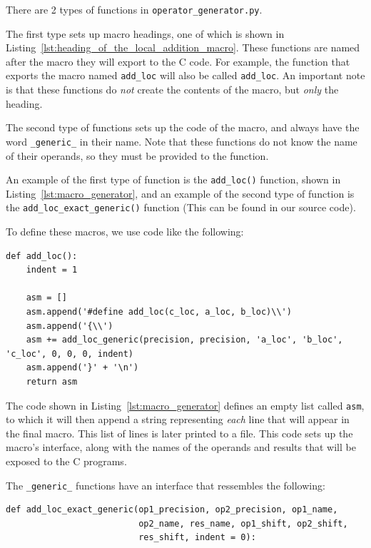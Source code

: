 \documentclass[12pt, a4paper]{report}
\begin{document}
There are 2 types of functions in \verb+operator_generator.py+.

The first type sets up macro headings, one of which is shown in
Listing~\ref{lst:heading_of_the_local_addition_macro}.
These functions are named after the macro they will export to the C code.
For example, the function that exports the macro named \verb+add_loc+ will also
be called \verb+add_loc+.
An important note is that these functions do \emph{not} create the contents of
the macro, but \emph{only} the heading.

The second type of functions sets up the code of the macro, and always have the
word \verb+_generic_+ in their name.
Note that these functions do not know the name of their operands, so they must
be provided to the function.

An example of the first type of function is the \verb+add_loc()+ function, shown
in Listing~\ref{lst:macro_generator}, and an example of the second type of
function is the \verb+add_loc_exact_generic()+ function (This can be found in
our source code).

To define these macros, we use code like the following:
\begin{lstlisting}
def add_loc():
    indent = 1

    asm = []
    asm.append('#define add_loc(c_loc, a_loc, b_loc)\\')
    asm.append('{\\')
    asm += add_loc_generic(precision, precision, 'a_loc', 'b_loc', 'c_loc', 0, 0, 0, indent)
    asm.append('}' + '\n')
    return asm
\end{lstlisting}

The code shown in Listing~\ref{lst:macro_generator} defines an empty list called
\verb+asm+, to which it will then append a string representing \emph{each} line
that will appear in the final macro.
This list of lines is later printed to a file.
This code sets up the macro's interface, along with the names of the operands
and results that will be exposed to the C programs.

The \verb+_generic_+ functions have an interface that ressembles the following:
\begin{lstlisting}
def add_loc_exact_generic(op1_precision, op2_precision, op1_name,
                          op2_name, res_name, op1_shift, op2_shift,
                          res_shift, indent = 0):
\end{lstlisting}
\end{document}
